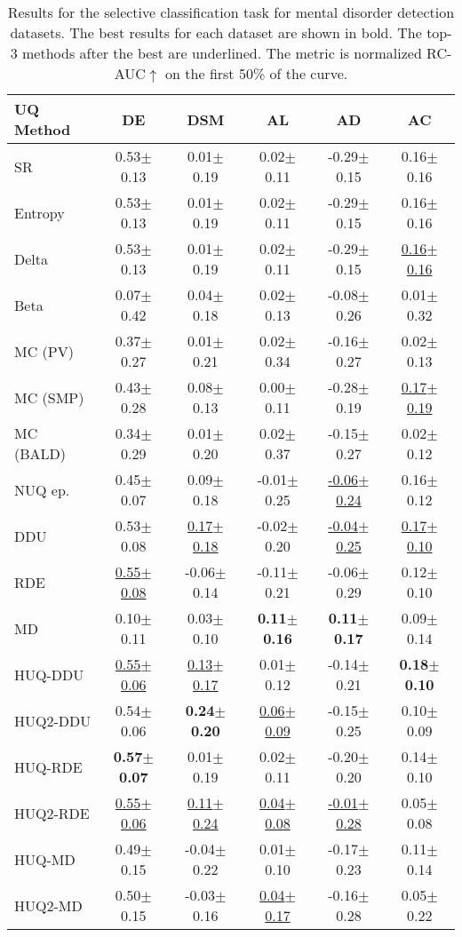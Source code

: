 \begin{table*}[t!]
\centering%
\begin{tabular}{l|c|c|c|c|c}
\toprule
\textbf{UQ Method} & \textbf{DE} & \textbf{DSM} & \textbf{AL} & \textbf{AD} & \textbf{AC} \\
\midrule

SR & 0.53$\pm$0.13 & 0.01$\pm$0.19 & 0.02$\pm$0.11 & -0.29$\pm$0.15 & 0.16$\pm$0.16 \\
Entropy & 0.53$\pm$0.13 & 0.01$\pm$0.19 & 0.02$\pm$0.11 & -0.29$\pm$0.15 & 0.16$\pm$0.16 \\
Delta & 0.53$\pm$0.13 & 0.01$\pm$0.19 & 0.02$\pm$0.11 & -0.29$\pm$0.15 & \underline{0.16$\pm$0.16} \\
Beta & 0.07$\pm$0.42 & 0.04$\pm$0.18 & 0.02$\pm$0.13 & -0.08$\pm$0.26 & 0.01$\pm$0.32 \\ \midrule
MC (PV) & 0.37$\pm$0.27 & 0.01$\pm$0.21 & 0.02$\pm$0.34 & -0.16$\pm$0.27 & 0.02$\pm$0.13 \\
MC (SMP) & 0.43$\pm$0.28 & 0.08$\pm$0.13 & 0.00$\pm$0.11 & -0.28$\pm$0.19 & \underline{0.17$\pm$0.19} \\
MC (BALD) & 0.34$\pm$0.29 & 0.01$\pm$0.20 & 0.02$\pm$0.37 & -0.15$\pm$0.27 & 0.02$\pm$0.12 \\ \midrule
NUQ ep. & 0.45$\pm$0.07 & 0.09$\pm$0.18 & -0.01$\pm$0.25 & \underline{-0.06$\pm$0.24} & 0.16$\pm$0.12 \\
DDU & 0.53$\pm$0.08 & \underline{0.17$\pm$0.18} & -0.02$\pm$0.20 & \underline{-0.04$\pm$0.25} & \underline{0.17$\pm$0.10} \\
RDE & \underline{0.55$\pm$0.08} & -0.06$\pm$0.14 & -0.11$\pm$0.21 & -0.06$\pm$0.29 & 0.12$\pm$0.10 \\
MD & 0.10$\pm$0.11 & 0.03$\pm$0.10 & \textbf{0.11$\pm$0.16} & \textbf{0.11$\pm$0.17} & 0.09$\pm$0.14 \\ \midrule
HUQ-DDU & \underline{0.55$\pm$0.06} & \underline{0.13$\pm$0.17} & 0.01$\pm$0.12 & -0.14$\pm$0.21 & \textbf{0.18$\pm$0.10} \\
HUQ2-DDU & 0.54$\pm$0.06 & \textbf{0.24$\pm$0.20} & \underline{0.06$\pm$0.09} & -0.15$\pm$0.25 & 0.10$\pm$0.09 \\
HUQ-RDE & \textbf{0.57$\pm$0.07} & 0.01$\pm$0.19 & 0.02$\pm$0.11 & -0.20$\pm$0.20 & 0.14$\pm$0.10 \\
HUQ2-RDE & \underline{0.55$\pm$0.06} & \underline{0.11$\pm$0.24} & \underline{0.04$\pm$0.08} & \underline{-0.01$\pm$0.28} & 0.05$\pm$0.08 \\
HUQ-MD & 0.49$\pm$0.15 & -0.04$\pm$0.22 & 0.01$\pm$0.10 & -0.17$\pm$0.23 & 0.11$\pm$0.14 \\
HUQ2-MD & 0.50$\pm$0.15 & -0.03$\pm$0.16 & \underline{0.04$\pm$0.17} & -0.16$\pm$0.28 & 0.05$\pm$0.22 \\
\bottomrule
\end{tabular}
\caption{\label{tab:psy_ue_rubioroberta_50}Results for the selective classification task for mental disorder detection datasets. The best results for each dataset are shown in bold. The top-3 methods after the best are underlined. The metric is normalized RC-AUC$\uparrow$ on the first 50\% of the curve.}
\end{table*}









